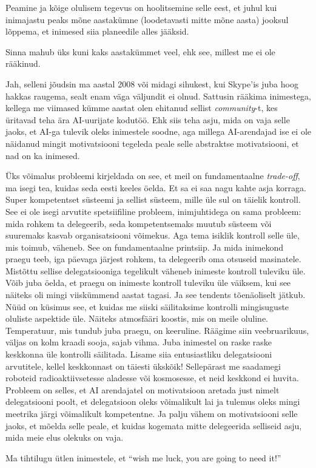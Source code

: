 
Peamine ja kõige olulisem tegevus on hoolitsemine selle eest, et juhul kui inimajastu peaks mõne aastakümne (loodetavasti mitte mõne aasta) jooksul lõppema, et inimesed siia planeedile alles jääksid.


Sinna mahub üks kuni kaks aastakümmet veel, ehk see, millest me ei ole rääkinud. 


Jah, selleni jõudsin ma aastal 2008 või midagi sihukest, kui Skype'is juba hoog hakkas raugema, sealt enam väga väljundit ei olnud. Sattusin rääkima inimestega, kellega me viimased kümme aastat olen ehitanud sellist \emph{community}-t, kes üritavad teha ära AI-uurijate kodutöö. Ehk siis teha asju, mida on vaja selle jaoks, et AI-ga tulevik oleks inimestele soodne, aga millega AI-arendajad ise ei ole näidanud mingit motivatsiooni tegeleda peale selle abstraktse motivatsiooni, et nad on ka inimesed.

Üks võimalus probleemi kirjeldada on see, et meil on fundamentaalne \emph{trade-off}, ma isegi tea, kuidas seda eesti keeles öelda. Et sa ei saa nagu kahte asja korraga. Super kompetentset süsteemi ja sellist süsteem, mille üle sul on täielik kontroll. See ei ole isegi arvutite spetsiifiline probleem, inimjuhtidega on sama probleem: mida rohkem ta delegeerib, seda kompetentsemaks muutub süsteem või suuremaks kasvab organisatsiooni võimekus. Aga tema isiklik kontroll selle üle, mis toimub, väheneb. See on fundamentaalne printsiip. Ja mida inimekond praegu teeb, iga päevaga järjest rohkem, ta delegeerib oma otsuseid masinatele. Mistõttu sellise delegatsiooniga tegelikult väheneb inimeste kontroll tuleviku üle. Võib juba öelda, et praegu on inimeste kontroll tuleviku üle väiksem, kui see näiteks oli mingi viiskümmend aastat tagasi. Ja see tendents tõenäoliselt jätkub. Nüüd on küsimus see, et kuidas me siiski säilitaksime kontrolli mingisuguste oluliste aspektide üle. Näiteks atmosfääri koostis, mis on meile oluline. Temperatuur, mis tundub juba praegu, on keeruline. Räägime siin veebruarikuus, väljas on kolm kraadi sooja, sajab vihma. Juba inimestel on raske raske keskkonna üle kontrolli säilitada. Lisame siia entusiastliku delegatsiooni arvutitele, kellel keskkonnast on täiesti ükskõik! Sellepärast me saadamegi roboteid radioaktiivsetesse aladesse või kosmosesse, et neid keskkond ei huvita. Probleem on selles, et AI arendajatel on motivatsioon aretada just nimelt delegatsiooni poolt, et delegatsioon oleks võimalikult lai ja tulemus oleks mingi meetrika järgi võimalikult kompetentne. Ja palju vähem on motivatsiooni selle jaoks, et mõelda selle peale, et kuidas kogemata mitte delegeerida selliseid asju, mida meie elus olekuks on vaja.


Ma tihtilugu ütlen inimestele, et \enquote{wish me luck, you are going to need it!}
